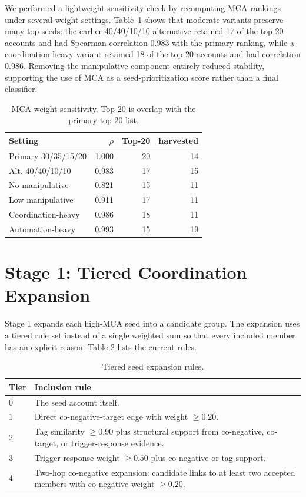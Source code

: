 \documentclass[conference]{IEEEtran}
\begin{document}
We performed a lightweight sensitivity check by recomputing MCA rankings under
several weight settings. Table~\ref{tab:sensitivity} shows that moderate
variants preserve many top seeds: the earlier 40/40/10/10 alternative retained
17 of the top 20 accounts and had Spearman correlation 0.983 with the primary
ranking, while a coordination-heavy variant retained 18 of the top 20 accounts
and had correlation 0.986. Removing the manipulative component entirely
reduced stability, supporting the use of MCA as a seed-prioritization score
rather than a final classifier.

\begin{table}[htbp]
\centering
\caption{MCA weight sensitivity. Top-20 is overlap with the primary top-20 list.}
\label{tab:sensitivity}
\scriptsize
\begin{tabular}{p{}rrr}
\toprule
Setting & $\rho$ & Top-20 & harvested \\
\midrule
Primary 30/35/15/20 & 1.000 & 20 & 14 \\
Alt. 40/40/10/10 & 0.983 & 17 & 15 \\
No manipulative & 0.821 & 15 & 11 \\
Low manipulative & 0.911 & 17 & 11 \\
Coordination-heavy & 0.986 & 18 & 11 \\
Automation-heavy & 0.993 & 15 & 19 \\
\bottomrule
\end{tabular}
\end{table}

\section{Stage 1: Tiered Coordination Expansion}

Stage 1 expands each high-MCA seed into a candidate group. The expansion uses
a tiered rule set instead of a single weighted sum so that every included
member has an explicit reason. Table \ref{tab:tier} lists the current rules.

\begin{table}[htbp]
\centering
\caption{Tiered seed expansion rules.}
\label{tab:tier}
\small
\begin{tabular}{p{}p{}}
\toprule
Tier & Inclusion rule \\
\midrule
0 & The seed account itself. \\
1 & Direct co-negative-target edge with weight $\geq 0.20$. \\
2 & Tag similarity $\geq 0.90$ plus structural support from co-negative, co-target, or trigger-response evidence. \\
3 & Trigger-response weight $\geq 0.50$ plus co-negative or tag support. \\
4 & Two-hop co-negative expansion: candidate links to at least two accepted members with co-negative weight $\geq 0.20$. \\
\bottomrule
\end{tabular}
\end{table}
\end{document}
